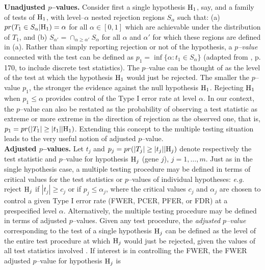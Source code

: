 \documentclass[11pt]{article}
\begin{document}
{\bf Unadjusted $p$--values.} Consider first a single hypothesis ${\rm H}_1$, say, and a family of tests of ${\rm H}_1$, with level--$\alpha$ nested rejection regions $S_{\alpha}$ such that: (a) $pr(T_1 \in S_{\alpha}| {\rm H}_1) = \alpha$ for all $\alpha \in [0, 1]$ which are achievable under the distribution of $T_1$, and (b) $S_{\alpha'} = \cap_{\alpha \geq \alpha'} S_{\alpha}$ for all $\alpha$ and $\alpha'$ for which these regions are defined in (a). 
Rather than simply reporting rejection or not of the hypothesis, a {\it $p$--value} connected with the test can be defined as $p_1 = \inf \{ \alpha : t_1 \in S_{\alpha} \}$ (adapted from \cite{TSH}, p. 170, to include discrete test statistics). The $p$--value can be thought of as the level of the test at which the hypothesis ${\rm H}_1$ would just be rejected. The smaller the $p$--value $p_1$, the stronger the evidence against the null hypothesis ${\rm H}_1$. Rejecting ${\rm H}_1$ when $p_1 \leq \alpha$ provides control of the Type I error rate at level $\alpha$. In our context, the $p$--value can also be restated as the probability of observing a test statistic as extreme or more extreme in the direction of rejection as the observed one, that is, $p_1 = pr(|T_1|\geq |t_1| | {\rm H}_1)$.  Extending this concept to the multiple testing situation leads to the very useful notion of adjusted $p$--value.\\

{\bf Adjusted $p$--values.} Let $t_j$ and $p_j = pr(|T_j| \geq |t_j| | {\rm H}_j)$ denote respectively the test statistic and $p$--value for hypothesis ${\rm H}_j$ (gene $j$), $j=1,\ldots,m$. Just as in the single hypothesis case, a multiple testing procedure may be defined in terms of critical values for the test statistics or $p$--values of individual hypotheses: {\it e.g.} reject ${\rm H}_j$ if $|t_j| \geq c_j$ or if $p_j \leq \alpha_j$, where the critical values $c_j$ and $\alpha_j$ are chosen to control a given Type I error rate (FWER, PCER, PFER, or FDR) at a prespecified level $\alpha$. Alternatively, the multiple testing procedure may be defined in terms of adjusted $p$--values. Given any test procedure, the {\it adjusted $p$--value} corresponding to the test of a single hypothesis ${\rm H}_j$ can be defined as the level of the entire test procedure at which ${\rm H}_j$ would just be rejected, given the values of all test statistics involved \citep{Hommel&Bernhard99,Shaffer95,Westfall&Young93,Wright92,Yekutieli&Benjamini99}. If interest is in controlling the FWER, the FWER adjusted $p$--value for hypothesis ${\rm H}_j$ is
\end{document}
